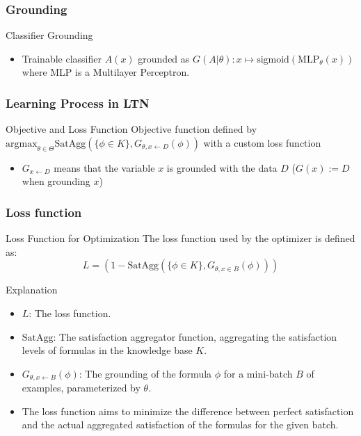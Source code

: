 \documentclass{beamer}
\begin{document}
\begin{frame}
  \frametitle{Grounding}
  \begin{block}{Classifier Grounding}
    \begin{itemize}
    \item Trainable classifier \( A(x) \) grounded as \( G(A |
      \theta): x \mapsto \text{sigmoid}(\text{MLP}_\theta(x)) \)
      where MLP is a Multilayer Perceptron.
    \end{itemize}
  \end{block}
\end{frame}

\begin{frame}
  \frametitle{Learning Process in LTN}
  \begin{block}{Objective and Loss Function}
    Objective function defined by
    \( \text{argmax}_{\theta \in \Theta} \text{SatAgg}(\{\phi \in K\},
    G_{\theta, x \leftarrow D}(\phi)) \) with a custom loss function
    \begin{itemize}
    \item $G_{x \leftarrow D}$ means that the variable $x$ is grounded
      with the data $D$ ($G(x) := D$ when grounding $x$)
    \end{itemize}
  \end{block}
\end{frame}

\begin{frame}
  \frametitle{Loss function}
  \begin{block}{Loss Function for Optimization}
    The loss function used by the optimizer is defined as:
    \[ L = \left( 1 - \text{SatAgg} \left( \{\phi \in K\}, G_{\theta, x
            \in B}(\phi) \right) \right) \]
  \end{block}
  \begin{block}{Explanation}
    \begin{itemize}
    \item \(L\): The loss function.
    \item \(\text{SatAgg}\): The satisfaction aggregator function, aggregating the satisfaction levels of formulas in the knowledge base \(K\).
    \item \(G_{\theta, x \leftarrow B}(\phi)\): The grounding of the
      formula \(\phi\) for a mini-batch \(B\) of examples,
      parameterized by \(\theta\).
    \item The loss function aims to minimize the difference between
      perfect satisfaction and the actual aggregated satisfaction
      of the formulas for the given batch.
\end{itemize}
\end{block}  
\end{frame}
\end{document}
